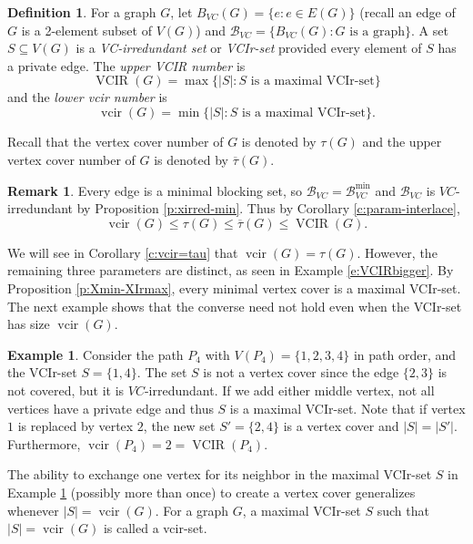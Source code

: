 \documentclass{article}
\numberwithin{figure}{section}
\numberwithin{table}{section}
\numberwithin{equation}{section}
\theoremstyle{definition}
\newtheorem{rem}[thm]{Remark}
\theoremstyle{definition}
\newtheorem{defn}[thm]{Definition}
\theoremstyle{definition}
\newtheorem{ex}[thm]{Example}
\newcommand{\B}{\mathcal{B}}
\newcommand{\ol}{\overline}
\newcommand{\vc}{\tau}
\newcommand{\vcbar}{\ol\vc}
\DeclareMathOperator{\VCIR}{VCIR}
\DeclareMathOperator{\vcir}{vcir}
\begin{document}
\begin{defn}
    For a graph $G$, let $B_{VC}(G)=\{ e: e\in E(G)\}$ (recall an edge of $G$ is a 2-element subset of $V(G)$) and $\B_{VC}=\{B_{VC}(G): G\mbox{ is a graph}\}$. A set $S\subseteq V(G)$ is a \emph{VC-irredundant set} or \emph{VCIr-set} provided every element of $S$ has a private edge. 
The \emph{upper VCIR number} is \[\VCIR(G) = \max\{|S|: S \text{ is a maximal VCIr-set}\}\] and the \emph{lower vcir number} is \[\vcir(G) = \min\{|S| : S \text{ is a maximal VCIr-set}\}.\]
\end{defn}



 Recall that the vertex cover  number of $G$ is denoted by $\tau(G)$ and the upper vertex cover  number of $G$ is denoted  by $\vcbar(G)$.  

\begin{rem}\label{VCIr-robust}
      Every edge is a minimal blocking set,  so $\B_{VC}=\B_{VC}^{\min}$ and $\B_{VC}$ is $VC$-irredundant by Proposition \ref{p:xirred-min}.  Thus by Corollary \ref{c:param-interlace},     \[ \vcir(G)\le \vc(G)\le \vcbar(G)\le \VCIR(G).\]
  \end{rem}







 We will see in Corollary \ref{c:vcir=tau} that $\vcir(G)=\vc(G)$.  However, the remaining three parameters are distinct, as seen in Example \ref{e:VCIRbigger}.
 By Proposition \ref{p:Xmin-XIrmax}, every minimal vertex cover is a maximal VCIr-set.  The next example shows that the converse need not hold even when the VCIr-set has size $\vcir(G)$.

\begin{ex}\label{ex:VC-P4}
    Consider the path $P_4$ with  $V(P_4)=\{1,2,3,4\}$ in path order, and the VCIr-set $S=\{1,4\}$. The set $S$ is not a vertex cover since the edge $\{2,3\}$ is not covered, but it is $VC$-irredundant. If we add either middle vertex, not all vertices have a private edge and thus $S$ is a maximal VCIr-set. Note that if vertex $1$ is replaced by vertex $2$, the new set $S'=\{2,4\}$ is a vertex cover and $|S|=|S'|$. Furthermore, $\vcir(P_4)=2=\VCIR(P_4)$.
\end{ex}

The ability to exchange one vertex for its neighbor in the maximal VCIr-set $S$ in Example \ref{ex:VC-P4} (possibly more than once) to create a vertex cover generalizes whenever $|S|=\vcir(G)$. For a graph $G$, a maximal VCIr-set $S$ such that  $|S|=\vcir(G)$ is called a vcir-set. 
  
\end{document}
